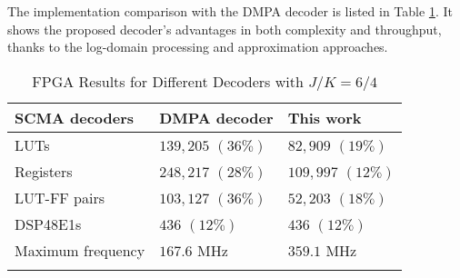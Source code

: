 \documentclass[journal,twoside]{IEEEtran}
\begin{document}
The implementation comparison with the DMPA decoder is listed in Table \ref{tab:fpgare}. It shows the proposed decoder's advantages in both complexity and throughput, thanks to the log-domain processing and approximation approaches.
\begin{table}[htbp]
\tabcolsep 1mm
\renewcommand{\arraystretch}{1.2}
\centering
\footnotesize
\caption{FPGA Results for Different Decoders with $J/K=6/4$}
\label{tab:fpgare}
\begin{tabular}{lll}
\Xhline{1.0pt}
SCMA decoders & DMPA decoder \cite{SCMA_archi} & This work\\
\hline
\rowcolor{gray!15}
LUTs   & $139,205$ $(36\%)$   &  $82,909$ $(19\%)$ \\
Registers & $248,217$ $(28\%)$ & $109,997$ $(12\%)$  \\
\rowcolor{gray!15}
LUT-FF pairs	& $103,127$ $(36\%)$    & $52,203$ $(18\%)$ \\
DSP48E1s & $436$ $(12\%)$ & $436$ $(12\%)$\\
\rowcolor{gray!15}
Maximum frequency & $167.6$ MHz  & $359.1$ MHz \\
\Xhline{1.0pt}
\end{tabular}
\end{table}
\end{document}
